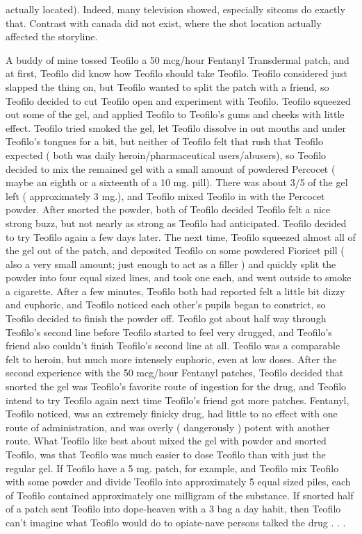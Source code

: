 \documentclass[12pt]{book}
\begin{document}
actually located). Indeed, many television showed, especially sitcoms do exactly that. Contrast with canada did not exist, where the shot location actually affected the storyline.



A buddy of mine tossed Teofilo a 50 mcg/hour Fentanyl Transdermal patch, and at first, Teofilo did know how Teofilo should take Teofilo. Teofilo considered just slapped the thing on, but Teofilo wanted to split the patch with a friend, so Teofilo decided to cut Teofilo open and experiment with Teofilo. Teofilo squeezed out some of the gel, and applied Teofilo to Teofilo's gums and cheeks with little effect. Teofilo tried smoked the gel, let Teofilo dissolve in out mouths and under Teofilo's tongues for a bit, but neither of Teofilo felt that rush that Teofilo expected ( both was daily heroin/pharmaceutical users/abusers), so Teofilo decided to mix the remained gel with a small amount of powdered Percocet ( maybe an eighth or a sixteenth of a 10 mg. pill). There was about 3/5 of the gel left ( approximately 3 mg.), and Teofilo mixed Teofilo in with the Percocet powder. After snorted the powder, both of Teofilo decided Teofilo felt a nice strong buzz, but not nearly as strong as Teofilo had anticipated. Teofilo decided to try Teofilo again a few days later. The next time, Teofilo squeezed almost all of the gel out of the patch, and deposited Teofilo on some powdered Fioricet pill ( also a very small amount; just enough to act as a filler ) and quickly split the powder into four equal sized lines, and took one each, and went outside to smoke a cigarette. After a few minutes, Teofilo both had reported felt a little bit dizzy and euphoric, and Teofilo noticed each other's pupils began to constrict, so Teofilo decided to finish the powder off. Teofilo got about half way through Teofilo's second line before Teofilo started to feel very drugged, and Teofilo's friend also couldn't finish Teofilo's second line at all. Teofilo was a comparable felt to heroin, but much more intensely euphoric, even at low doses. After the second experience with the 50 mcg/hour Fentanyl patches, Teofilo decided that snorted the gel was Teofilo's favorite route of ingestion for the drug, and Teofilo intend to try Teofilo again next time Teofilo's friend got more patches. Fentanyl, Teofilo noticed, was an extremely finicky drug, had little to no effect with one route of administration, and was overly ( dangerously ) potent with another route. What Teofilo like best about mixed the gel with powder and snorted Teofilo, was that Teofilo was much easier to dose Teofilo than with just the regular gel. If Teofilo have a 5 mg. patch, for example, and Teofilo mix Teofilo with some powder and divide Teofilo into approximately 5 equal sized piles, each of Teofilo contained approximately one milligram of the substance. If snorted half of a patch sent Teofilo into dope-heaven with a 3 bag a day habit, then Teofilo can't imagine what Teofilo would do to opiate-nave persons talked the drug . . . 
\end{document}
